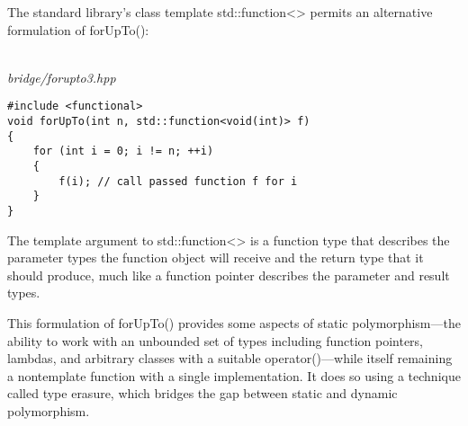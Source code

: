 The standard library’s class template std::function<> permits an alternative formulation of forUpTo():

\hspace*{\fill} \\ %
\noindent
\textit{bridge/forupto3.hpp}
\begin{lstlisting}[style=styleCXX]
#include <functional>
void forUpTo(int n, std::function<void(int)> f)
{
	for (int i = 0; i != n; ++i)
	{
		f(i); // call passed function f for i
	}
}
\end{lstlisting}

The template argument to std::function<> is a function type that describes the parameter types the function object will receive and the return type that it should produce, much like a function pointer describes the parameter and result types.

This formulation of forUpTo() provides some aspects of static polymorphism—the ability to work with an unbounded set of types including function pointers, lambdas, and arbitrary classes with a suitable operator()—while itself remaining a nontemplate function with a single implementation. It does so using a technique called type erasure, which bridges the gap between static and dynamic polymorphism.






























